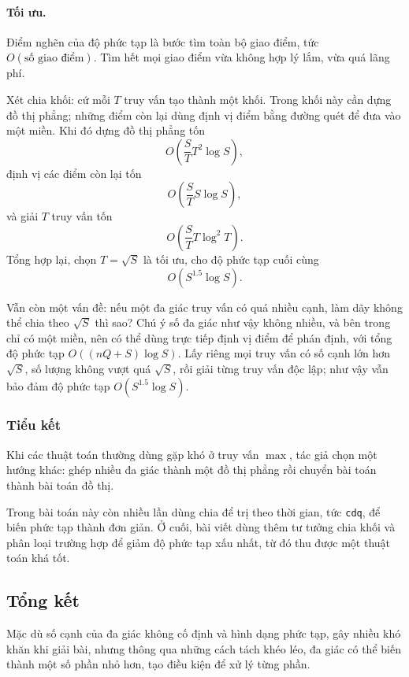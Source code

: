 \documentclass[11pt]{article}
\begin{document}
\paragraph{Tối ưu.}
Điểm nghẽn của độ phức tạp là bước tìm toàn bộ giao điểm, tức
\(O(\text{số giao điểm})\). Tìm hết mọi giao điểm vừa không hợp lý lắm, vừa quá
lãng phí.

Xét chia khối: cứ mỗi \(T\) truy vấn tạo thành một khối. Trong khối này cần dựng
đồ thị phẳng; những điểm còn lại dùng định vị điểm bằng đường quét để đưa vào
một miền. Khi đó dựng đồ thị phẳng tốn
\[
  O\left(\frac{S}{T}T^2\log S\right),
\]
định vị các điểm còn lại tốn
\[
  O\left(\frac{S}{T}S\log S\right),
\]
và giải \(T\) truy vấn tốn
\[
  O\left(\frac{S}{T}T\log^2 T\right).
\]
Tổng hợp lại, chọn \(T=\sqrt S\) là tối ưu, cho độ phức tạp cuối cùng
\[
  O(S^{1.5}\log S).
\]

Vẫn còn một vấn đề: nếu một đa giác truy vấn có quá nhiều cạnh, làm dãy không
thể chia theo \(\sqrt S\) thì sao? Chú ý số đa giác như vậy không nhiều, và bên
trong chỉ có một miền, nên có thể dùng trực tiếp định vị điểm để phán định, với
tổng độ phức tạp \(O((nQ+S)\log S)\). Lấy riêng mọi truy vấn có số cạnh lớn hơn
\(\sqrt S\), số lượng không vượt quá \(\sqrt S\), rồi giải từng truy vấn độc
lập; như vậy vẫn bảo đảm độ phức tạp \(O(S^{1.5}\log S)\).

\subsubsection{Tiểu kết}

Khi các thuật toán thường dùng gặp khó ở truy vấn \(\max\), tác giả chọn một
hướng khác: ghép nhiều đa giác thành một đồ thị phẳng rồi chuyển bài toán thành
bài toán đồ thị.

Trong bài toán này còn nhiều lần dùng chia để trị theo thời gian, tức
\texttt{cdq}, để biến phức tạp thành đơn giản. Ở cuối, bài viết dùng thêm tư
tưởng chia khối và phân loại trường hợp để giảm độ phức tạp xấu nhất, từ đó thu
được một thuật toán khá tốt.

\subsection{Tổng kết}

Mặc dù số cạnh của đa giác không cố định và hình dạng phức tạp, gây nhiều khó
khăn khi giải bài, nhưng thông qua những cách tách khéo léo, đa giác có thể biến
thành một số phần nhỏ hơn, tạo điều kiện để xử lý từng phần.
\end{document}
